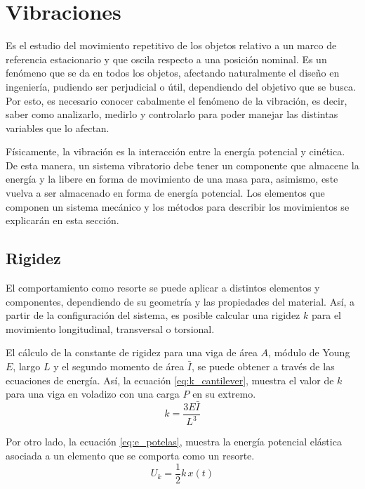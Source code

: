 \section{Vibraciones}
Es el estudio del movimiento repetitivo de los objetos relativo a un marco de referencia estacionario y que oscila respecto a una posición nominal. Es un fenómeno que se da en todos los objetos, afectando naturalmente el diseño en ingeniería, pudiendo ser perjudicial o útil, dependiendo del objetivo que se busca. Por esto, es necesario conocer cabalmente el fenómeno de la vibración, es decir, saber como analizarlo, medirlo y controlarlo para poder manejar las distintas variables que lo afectan.

Físicamente, la vibración es la interacción entre la energía potencial y cinética. De esta manera, un sistema vibratorio debe tener un componente que almacene la energía y la libere en forma de movimiento de una masa para, asimismo, este vuelva a ser almacenado en forma de energía potencial. Los elementos que componen un sistema mecánico y los métodos para describir los movimientos se explicarán en esta sección.


\subsection{Rigidez}
El comportamiento como resorte se puede aplicar a distintos elementos y componentes, dependiendo de su geometría y las propiedades del material. Así, a partir de la configuración del sistema, es posible calcular una rigidez $k$ para el movimiento longitudinal, transversal o torsional. 

El cálculo de la constante de rigidez para una viga de área $A$, módulo de Young $E$, largo $L$ y el segundo momento de área $\bar{I}$, se puede obtener a través de las ecuaciones de energía. Así, la ecuación \ref{eq:k_cantilever}, muestra el valor de $k$ para una viga en voladizo con una carga $P$ en su extremo.
\begin{equation}\label{eq:k_cantilever}
	k = \frac{3E\bar{I}}{L^3}
\end{equation}

Por otro lado, la ecuación \ref{eq:e_potelas}, muestra la energía potencial elástica asociada a un elemento que se comporta como un resorte.
\begin{equation}\label{eq:e_potelas}
	U_k = \frac{1}{2}k\,x(t)
\end{equation}


